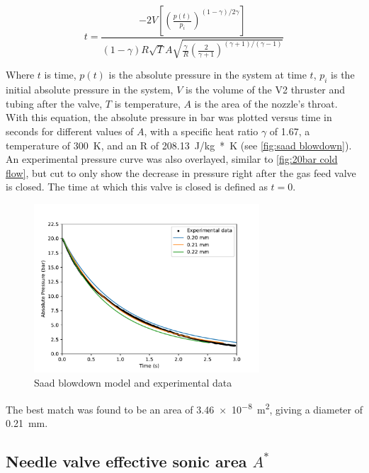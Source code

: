             \begin{equation}
                t =  \frac{-2V \left[\left(\frac{p(t)}{p_i}\right)^{(1-\gamma) / 2\gamma}\right]}{(1-\gamma) R \sqrt{T} A \sqrt{\frac{\gamma}{R}(\frac{2}{\gamma + 1})^{(\gamma+1) / (\gamma-1)}}}
            \end{equation}

            Where $t$ is time, $p(t)$ is the absolute pressure in the system at time $t$, $p_i$ is the initial absolute pressure in the system, $V$ is the volume of the V2 thruster and tubing after the valve, $T$ is temperature, $A$ is the area of the nozzle's throat.  With this equation, the absolute pressure in bar was plotted versus time in seconds for different values of $A$, with a specific heat ratio $\gamma$ of 1.67, a temperature of \qty{300}{K}, and an R of \qty{208.13}{J/kg*K} (see \autoref{fig:saad blowdown}). An experimental pressure curve was also overlayed, similar to \autoref{fig:20bar cold flow}, but cut to only show the decrease in pressure right after the gas feed valve is closed. The time at which this valve is closed is defined as $t=0$.

            \begin{figure}[!ht]
                \centering
                \includegraphics[width=0.75\textwidth]{assets/4 experiments/Saad blowdown fit.pdf}
                \caption{Saad blowdown model and experimental data}
                \label{fig:saad blowdown}
            \end{figure}

            The best match was found to be an area of \qty{3.46e-8}{m^2}, giving a diameter of \qty{0.21}{mm}.

        \subsection{Needle valve effective sonic area $A^*$}

